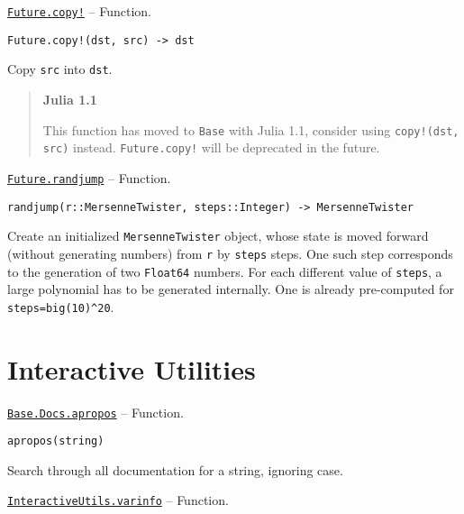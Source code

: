 \hypertarget{16402194721737034995}{} 
\hyperlink{16402194721737034995}{\texttt{Future.copy!}}  -- {Function.}

\begin{adjustwidth}{2em}{0pt}


\begin{verbatim}
Future.copy!(dst, src) -> dst
\end{verbatim}

Copy \texttt{src} into \texttt{dst}.

\begin{quote}
\textbf{Julia 1.1}

This function has moved to \texttt{Base} with Julia 1.1, consider using \texttt{copy!(dst, src)} instead. \texttt{Future.copy!} will be deprecated in the future.

\end{quote}


\end{adjustwidth}
\hypertarget{16884066495147636882}{} 
\hyperlink{16884066495147636882}{\texttt{Future.randjump}}  -- {Function.}

\begin{adjustwidth}{2em}{0pt}


\begin{verbatim}
randjump(r::MersenneTwister, steps::Integer) -> MersenneTwister
\end{verbatim}

Create an initialized \texttt{MersenneTwister} object, whose state is moved forward (without generating numbers) from \texttt{r} by \texttt{steps} steps. One such step corresponds to the generation of two \texttt{Float64} numbers. For each different value of \texttt{steps}, a large polynomial has to be generated internally. One is already pre-computed for \texttt{steps=big(10){\textasciicircum}20}.



\end{adjustwidth}

\hypertarget{6372583980485609941}{}


\chapter{Interactive Utilities}


\hypertarget{6069714544176255543}{} 
\hyperlink{6069714544176255543}{\texttt{Base.Docs.apropos}}  -- {Function.}

\begin{adjustwidth}{2em}{0pt}


\begin{verbatim}
apropos(string)
\end{verbatim}

Search through all documentation for a string, ignoring case.



\end{adjustwidth}
\hypertarget{18269429703422902914}{} 
\hyperlink{18269429703422902914}{\texttt{InteractiveUtils.varinfo}}  -- {Function.}

